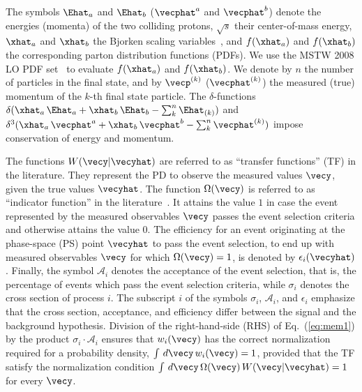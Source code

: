 The symbols $\Ehat_{a}$ and $\Ehat_{b}$ ($\vecphat^{a}$ and $\vecphat^{b}$) denote the energies (momenta) of the two colliding protons,
$\sqrt{s}$ their center-of-mass energy,
$\xhat_{a}$ and $\xhat_{b}$ the Bjorken scaling variables~\cite{Bjorkenx},
and $f(\xhat_{a})$ and $f(\xhat_{b})$ the corresponding parton distribution functions (PDFs).
We use the \textrm{MSTW} 2008 LO PDF set~\cite{MSTW} to evaluate $f(\xhat_{a})$ and $f(\xhat_{b})$.
We denote by $n$ the number of particles in the final state,
and by $\vecp^{(k)}$ ($\vecphat^{(k)}$) the measured (true) momentum of the $k$-th final state particle. 
The $\delta$-functions $\delta( \xhat_{a} \, \Ehat_{a} + \xhat_{b} \, \Ehat_{b} - \sum_{k}^{n} \Ehat_{(k)})$
and $\delta^{3}( \xhat_{a} \, \vecphat^{a} + \xhat_{b} \, \vecphat^{b} - \sum_{k}^{n} \vecphat^{(k)})$ 
impose conservation of energy and momentum.

The functions $W(\vecy|\vecyhat)$ are referred to as ``transfer functions'' (TF) in the literature.
They represent the PD to observe the measured values $\vecy$, given the true values $\vecyhat$.
The function $\Omega(\vecy)$ is referred to as ``indicator function'' in the literature~\cite{Fiedler:2010sg,Volobouev:2011vb}.
It attains the value $1$ in case the event represented by the measured observables $\vecy$ passes the event selection criteria and otherwise attains the value $0$.
The efficiency for an event originating at the phase-space (PS) point
$\vecyhat$ to pass the event selection, \ie to end up with measured
observables $\vecy$ for which $\Omega(\vecy) = 1$,
is denoted by $\epsilon_{i}(\vecyhat)$. 
Finally, the symbol $\mathcal{A}_{i}$ denotes the acceptance of the event selection, 
that is, the percentage of events which pass the event selection criteria,
while $\sigma_{i}$ denotes the cross section of process $i$.
The subscript $i$ of the symbols $\sigma_{i}$, $\mathcal{A}_{i}$, and $\epsilon_{i}$ 
emphasize that the cross section, acceptance, and efficiency differ between the signal and the background hypothesis.
Division of the right-hand-side (RHS) of Eq.~(\ref{eq:mem1}) by the product $\sigma_{i} \cdot \mathcal{A}_{i}$
ensures that $w_{i}(\vecy)$ has the correct normalization required for a probability density, 
\ie $\int \, d\vecy \, w_{i}(\vecy) = 1$,
provided that the TF satisfy the normalization condition
$\int \, d\vecy \, \Omega(\vecy) \, W(\vecy|\vecyhat) = 1$
for every $\vecy$.

